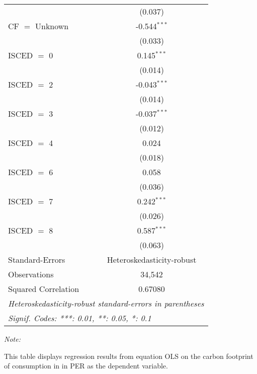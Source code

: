 \begin{table}[htbp!]
\begin{adjustbox}{width = 1\textwidth, max height = 0.95\textheight, center}
\begin{threeparttable}[b]
\begin{tabular}{lc}
                                & (0.037)\\   
            CF $=$ Unknown      & -0.544$^{***}$\\   
                                & (0.033)\\   
            ISCED $=$ 0         & 0.145$^{***}$\\   
                                & (0.014)\\   
            ISCED $=$ 2         & -0.043$^{***}$\\   
                                & (0.014)\\   
            ISCED $=$ 3         & -0.037$^{***}$\\   
                                & (0.012)\\   
            ISCED $=$ 4         & 0.024\\   
                                & (0.018)\\   
            ISCED $=$ 6         & 0.058\\   
                                & (0.036)\\   
            ISCED $=$ 7         & 0.242$^{***}$\\   
                                & (0.026)\\   
            ISCED $=$ 8         & 0.587$^{***}$\\   
                                & (0.063)\\   
            \midrule 
            Standard-Errors     & Heteroskedasticity-robust \\   
            Observations        & 34,542\\  
            Squared Correlation & 0.67080\\  
            \midrule \midrule
            \multicolumn{2}{l}{\emph{Heteroskedasticity-robust standard-errors in parentheses}}\\
            \multicolumn{2}{l}{\emph{Signif. Codes: ***: 0.01, **: 0.05, *: 0.1}}\\
         \end{tabular}
         
         \begin{tablenotes}\item \medskip \textit{Note:}
            \item This table displays regression results from equation OLS on the carbon footprint of consumption in  in PER as the dependent variable.  
         \end{tablenotes}
      \end{threeparttable}
   \end{adjustbox}
\end{table}


